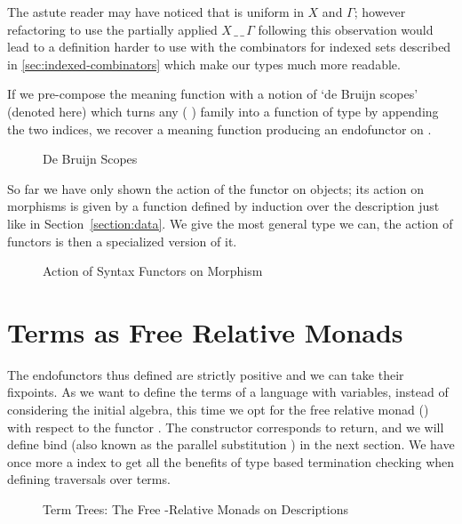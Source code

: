 The astute reader may have noticed that  is uniform in $X$
and $\Gamma$; however refactoring  to use the partially
applied $X\,\_\,\_\,\Gamma$ following this observation would lead to
a definition harder to use with the combinators for indexed sets
described in \cref{sec:indexed-combinators}
which make our types much more readable.

If we pre-compose the meaning function  with a notion of
`de Bruijn scopes' (denoted  here) which turns any
{( )} family into a function
of type      by appending the two
 indices, we recover a meaning function producing an endofunctor on
 .

\begin{figure}[h]
\caption{De Bruijn Scopes}\label{figure:debruijnscope}
\end{figure}

So far we have only shown the action of the functor on objects; its action on
morphisms is given by a function  defined by induction over the
description just like in Section~\ref{section:data}. We give  the most
general type we can, the action of functors is then a specialized version of it.

\begin{figure}[h]
\caption{Action of Syntax Functors on Morphism\label{figure:descfmap}}
\end{figure}

\section{Terms as Free Relative Monads}

The endofunctors thus defined are strictly positive and we can take
their fixpoints.
As we want to define the terms of a language with variables, instead of
considering the initial algebra, this time we opt for the free relative
monad (\cite{Altenkirch2010, JFR4389}) with respect to the functor .
The  constructor corresponds to return, and we will define bind (also
known as the parallel substitution ) in the next section.
We have once more a  index to get all the benefits of type based
termination checking when defining traversals over terms.

\begin{figure}[h]
\caption{Term Trees: The Free -Relative Monads on Descriptions\label{figure:freemonad}}
\end{figure}

